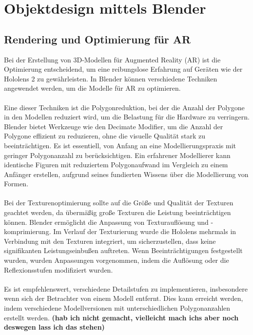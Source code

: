 \section{Objektdesign mittels Blender}
\subsection{Rendering und Optimierung für AR}
Bei der Erstellung von 3D-Modellen für Augmented Reality (AR) ist die Optimierung entscheidend, um eine reibungslose
Erfahrung auf Geräten wie der Hololens 2 zu gewährleisten. In Blender können verschiedene Techniken angewendet werden,
um die Modelle für AR zu optimieren.\\
\\
Eine dieser Techniken ist die Polygonreduktion, bei der die Anzahl der Polygone in den Modellen reduziert wird, um die
Belastung für die Hardware zu verringern. Blender bietet Werkzeuge wie den Decimate Modifier, um die Anzahl der Polygone
effizient zu reduzieren, ohne die visuelle Qualität stark zu beeinträchtigen. Es ist essentiell, von Anfang an eine
Modellierungspraxis mit geringer Polygonanzahl zu berücksichtigen. Ein erfahrener Modellierer kann identische Figuren
mit reduziertem Polygonaufwand im Vergleich zu einem Anfänger erstellen, aufgrund seines fundierten Wissens über die
Modellierung von Formen.\\
\\
Bei der Texturenoptimierung sollte auf die Größe und Qualität der Texturen geachtet werden, da übermäßig große Texturen
die Leistung beeinträchtigen können. Blender ermöglicht die Anpassung von Texturauflösung und -komprimierung. Im Verlauf
der Texturierung wurde die Hololens mehrmals in Verbindung mit den Texturen integriert, um sicherzustellen, dass keine
signifikanten Leistungseinbußen auftreten. Wenn Beeinträchtigungen festgestellt wurden, wurden Anpassungen vorgenommen,
indem die Auflösung oder die Reflexionsstufen modifiziert wurden.\\
\\
Es ist empfehlenswert, verschiedene Detailstufen zu implementieren, insbesondere wenn sich der Betrachter von einem
Modell entfernt. Dies kann erreicht werden, indem verschiedene Modellversionen mit unterschiedlichen Polygonanzahlen
erstellt werden. \textbf{(hab ich nicht gemacht, vielleicht mach ichs aber noch deswegen lass ich das stehen)}

